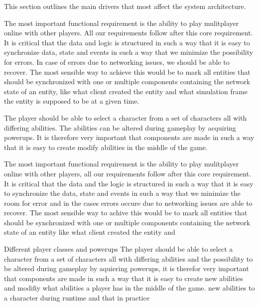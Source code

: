 	This section outlines the main drivers that most affect the system architecture.

	The most important functional requirement is the ability to play mulitplayer online with other	players. All our requirements follow after this core requirement. It is critical that the data and logic is structured in such a way that it is easy to synchronize data, state and events in such a way that we minimize the possibility for errors. In case of errors due to networking issues, we should be able to recover. The most sensible way to achieve this would be to mark all entities 	that should be synchronized with one or multiple components containing the network state of an entity, like what client created the entity and what simulation frame the entity is supposed to be at a given time.

	The player should be able to select a character from a set of characters all with differing abilities. The abilities can be altered during gameplay by acquiring powerups. It is therefore very important that components are made in such a way that it is easy to create modify abilities in the middle of the game.

	The most important functional requirement is the ability to play mulitplayer online with other 
	players, all our requirements follow after this core requirement. It is critical that the data and the logic is
	structured in such a way that it is easy to synchronize the data, state and events in such a way that we minimize the room for error
	and in the cases errors occure due to networking issues are able to recover. The most sensible way to achive this would be to mark all entities
	that should be synchronized with one or multiple components containing the network state of an entity like what client created the entity and

	Different player classes and powerups
	The player should be able to select a character from a set of characters all with differing abilities and the possibility to be altered during gameplay
	by aquiering powerups, it is therefor very important that components are made in such a way that it is easy to create new abilities and modifiy
	what abilities a player has in the middle of the game. new abilities to a character during runtime and that in practice 

